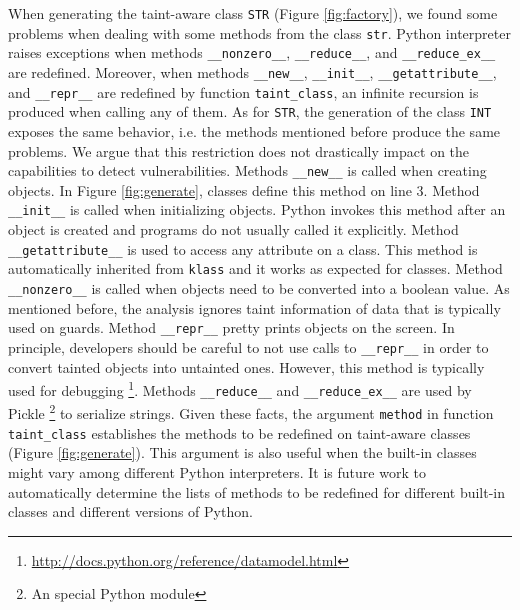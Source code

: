 When generating the taint-aware
class \texttt{STR} (Figure \ref{fig:factory}), 
we found some problems 
when dealing with   
some methods from the class \texttt{str}. 
Python interpreter raises exceptions when  
methods 
\texttt{\_\_nonzero\_\_},
\texttt{\_\_reduce\_\_}, and 
\texttt{\_\_reduce\_ex\_\_} are redefined.
Moreover, 
when methods  
\texttt{\_\_new\_\_}, \texttt{\_\_init\_\_}, 
\texttt{\_\_getattribute\_\_},  
and 
\texttt{\_\_repr\_\_}
are redefined by function \texttt{taint\_class},
an infinite recursion is produced when calling any of them.
As for \texttt{STR}, the generation of the \nametklass 
class \texttt{INT} exposes the same behavior, i.e. the 
methods mentioned before produce the same problems.
We argue 
that this restriction does not drastically impact on the capabilities to 
detect vulnerabilities.
Methods \texttt{\_\_new\_\_} 
is called 
when creating objects.
In Figure \ref{fig:generate}, \nametklass 
classes define this method 
on line 3.
Method \texttt{\_\_init\_\_} is called when 
initializing objects.  
Python invokes this method  after an object is created 
and programs do not usually called it explicitly.
Method \texttt{\_\_getattribute\_\_}
is used to access any attribute on a class.
This method is automatically inherited from 
\texttt{klass} and it works as expected for 
\nametklass classes.
Method \texttt{\_\_nonzero\_\_} is called when 
objects need to be converted into a boolean value.
As mentioned before, the
analysis ignores taint information of data 
that is typically used on guards. 
Method \texttt{\_\_repr\_\_} pretty prints  
objects on the screen. 
In principle, developers should be careful 
to not use calls to \texttt{\_\_repr\_\_} in order to 
convert tainted objects into untainted ones. 
However, this method is typically used for debugging 
\footnote{\url{http://docs.python.org/reference/datamodel.html}}.
Methods \texttt{\_\_reduce\_\_} and \texttt{\_\_reduce\_ex\_\_}
are used by Pickle \footnote{An special Python module} to serialize strings. 
Given these facts, 
the argument \texttt{method} in function \texttt{taint\_class} 
establishes the methods to be redefined on taint-aware classes
(Figure \ref{fig:generate}).
This argument is also useful when
the built-in classes might 
vary among different Python interpreters.
It is future work 
to automatically determine the lists of methods to be redefined for different 
built-in classes and different versions of Python.

